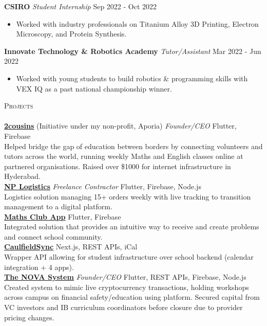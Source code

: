 \documentclass[a4paper]{article}
\newcommand{\lineunder} {
    \vspace*{-8pt} \\
    \hspace*{-10pt} \hrulefill \\
}
\newcommand{\header} [1] {
    {\hspace*{-10pt}\vspace*{6pt} \textsc{#1}}
    \vspace*{-6pt} \lineunder
}
\begin{document}
\textbf{CSIRO} \textit{Student Internship} \hfill Sep 2022 - Oct 2022\\
\vspace{-3mm}
\begin{itemize} \itemsep 0.5pt
\item Worked with industry professionals on Titanium Alloy 3D Printing, Electron Microscopy, and Protein Synthesis.
\end{itemize}
\vspace{-2mm}

\textbf{Innovate Technology \& Robotics Academy} \textit{Tutor/Assistant} \hfill Mar 2022 - Jun 2022\\
\vspace{-3mm}
\begin{itemize} \itemsep 0.5pt
	\item Worked with young students to build robotics \& programming skills with VEX IQ as a past national championship winner.
\end{itemize}
\vspace{-2mm}

\header{Projects}
\href{https://2cousins.org/}{\textbf{\ul{2cousins}}} (Initiative under my non-profit, Aporia) \textit{Founder/CEO} {\textsl{\hfill} Flutter, Firebase}\\
Helped bridge the gap of education between borders by connecting volunteers and tutors across the world, running weekly Maths and English classes online at partnered organisations.
Raised over \$1000 for internet infrastructure in Hyderabad.\\
\vspace*{1.5mm}
\href{https://nplogistics.com.au}{\textbf{\ul{NP Logistics}}} \textit{Freelance Contractor} {\textsl{\hfill} Flutter, Firebase, Node.js}\\
Logistics solution managing 15+ orders weekly with live tracking to transition management to a digital platform.\\
\vspace*{1.5mm}
\href{https://github.com/cgs-math/app}{\textbf{\ul{Maths Club App}}} {\textsl{\hfill} Flutter, Firebase}\\
Integrated solution that provides an intuitive way to receive and create problems and connect school community.\\
\vspace*{1.5mm}
\href{https://caulfieldsync.vercel.app/}{\textbf{\ul{CaulfieldSync}}} {\textsl{\hfill} Next.js, REST APIs, iCal}\\
Wrapper API allowing for student infrastructure over school backend (calendar integration + 4 apps).\\
\vspace*{1.5mm}
\href{https://the-nova-system.github.io/}{\textbf{\ul{The NOVA System}}} \textit{Founder/CEO} {\textsl{\hfill} Flutter, REST APIs, Firebase, Node.js}\\
Created system to mimic live cryptocurrency transactions, holding workshops across campus on financial safety/education using platform.
Secured capital from VC investors and IB curriculum coordinators before closure due to provider pricing changes.\\
\vspace*{1.5mm}
\end{document}
